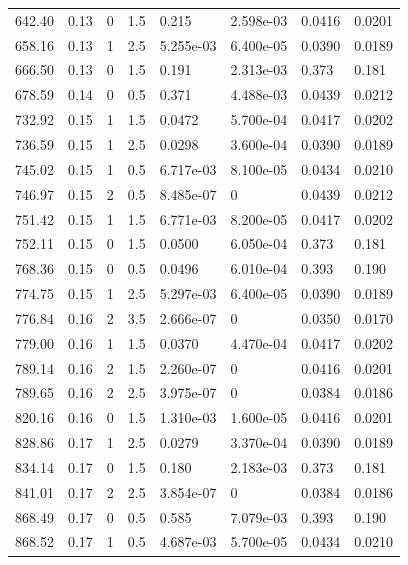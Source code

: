 \documentclass[preview]{standalone}
\begin{document}
{{{\begin{tabular}{L{1.2cm}C{1.2cm} C{0.3cm}C{0.5cm} C{1.4cm}C{1.4cm} C{1.4cm}C{1.4cm}}
  642.40  &  0.13  & 0     & 1.5 &  0.215  & 2.598e-03  & 0.0416 &  0.0201   \\ 
  658.16  &  0.13  & 1     & 2.5 &  5.255e-03  & 6.400e-05  & 0.0390 &  0.0189   \\ 
  666.50  &  0.13  & 0     & 1.5 &  0.191  & 2.313e-03  & 0.373 &  0.181   \\ 
  678.59  &  0.14  & 0     & 0.5 &  0.371  & 4.488e-03  & 0.0439 &  0.0212   \\ 
  732.92  &  0.15  & 1     & 1.5 &  0.0472  & 5.700e-04  & 0.0417 &  0.0202   \\ 
  736.59  &  0.15  & 1     & 2.5 &  0.0298  & 3.600e-04  & 0.0390 &  0.0189   \\ 
  745.02  &  0.15  & 1     & 0.5 &  6.717e-03  & 8.100e-05  & 0.0434 &  0.0210   \\ 
  746.97  &  0.15  & 2     & 0.5 &  8.485e-07  & 0  & 0.0439 &  0.0212   \\ 
  751.42  &  0.15  & 1     & 1.5 &  6.771e-03  & 8.200e-05  & 0.0417 &  0.0202   \\ 
  752.11  &  0.15  & 0     & 1.5 &  0.0500  & 6.050e-04  & 0.373 &  0.181   \\ 
  768.36  &  0.15  & 0     & 0.5 &  0.0496  & 6.010e-04  & 0.393 &  0.190   \\ 
  774.75  &  0.15  & 1     & 2.5 &  5.297e-03  & 6.400e-05  & 0.0390 &  0.0189   \\ 
  776.84  &  0.16  & 2     & 3.5 &  2.666e-07  & 0  & 0.0350 &  0.0170   \\ 
  779.00  &  0.16  & 1     & 1.5 &  0.0370  & 4.470e-04  & 0.0417 &  0.0202   \\ 
  789.14  &  0.16  & 2     & 1.5 &  2.260e-07  & 0  & 0.0416 &  0.0201   \\ 
  789.65  &  0.16  & 2     & 2.5 &  3.975e-07  & 0  & 0.0384 &  0.0186   \\ 
  820.16  &  0.16  & 0     & 1.5 &  1.310e-03  & 1.600e-05  & 0.0416 &  0.0201   \\ 
  828.86  &  0.17  & 1     & 2.5 &  0.0279  & 3.370e-04  & 0.0390 &  0.0189   \\ 
  834.14  &  0.17  & 0     & 1.5 &  0.180  & 2.183e-03  & 0.373 &  0.181   \\ 
  841.01  &  0.17  & 2     & 2.5 &  3.854e-07  & 0  & 0.0384 &  0.0186   \\ 
  868.49  &  0.17  & 0     & 0.5 &  0.585  & 7.079e-03  & 0.393 &  0.190   \\ 
  868.52  &  0.17  & 1     & 0.5 &  4.687e-03  & 5.700e-05  & 0.0434 &  0.0210   \\ 

\end{tabular}}}}
\end{document}
